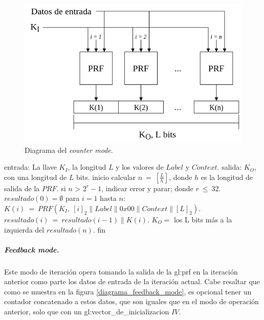 \begin{figure}[H]
  \begin{center}
    \includegraphics[width=0.75\linewidth]{diagramas/counter_mode}
    \caption{Diagrama del \textit{counter mode}.}
    \label{diagrama_counter_mode}
   \end{center}
\end{figure}

\begin{pseudocodigo}[caption={Funcionamiento del \textit{counter mode}.}, 
label={mi:1}]
  entrada:   La llave $K_I$, la longitud $L$ y los valores de $Label$ y $Context$.
  salida:    $K_O$, con una longitud de $L$ bits.
  inicio
    calcular $n\: =\: [\frac{L}{h}]$, donde $h$ es la longitud de salida de la $PRF$.
    si $n$ > $2^r-1$, indicar error y parar; donde $r\: \leq\: 32$.
    $resultado(0) = \emptyset$
    para $i=1$ hasta $n$:
      $K(i)\: =\: PRF(K_I,\: {[i]}_2 \parallel Label \parallel 0x00 \parallel Context \parallel {[L]}_2 )$.
      $resultado(i)\: =\: resultado(i-1) \parallel K(i)$.
    $K_O =$ los L bits más a la izquierda del $resultado(n)$.
  fin
\end{pseudocodigo}

\subparagraph{Feedback mode.}
Este modo de iteración opera tomando la salida de la \gls{gl:prf} en la
iteración anterior como parte los datos de entrada de la iteración actual.
Cabe resaltar que como se muestra en la figura \ref{diagrama_feedback_mode}, 
es opcional tener un contador concatenado a estos datos, que son iguales que 
en el modo de operación anterior, solo que con un 
\gls{gl:vector_de_inicializacion} $IV$.

